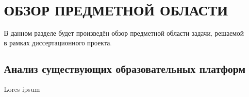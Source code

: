 \section{ОБЗОР ПРЕДМЕТНОЙ ОБЛАСТИ}

В данном разделе будет произведён обзор предметной области задачи, решаемой в рамках диссертационного проекта.

\subsection{Анализ существующих образовательных платформ}

Lores ipsum